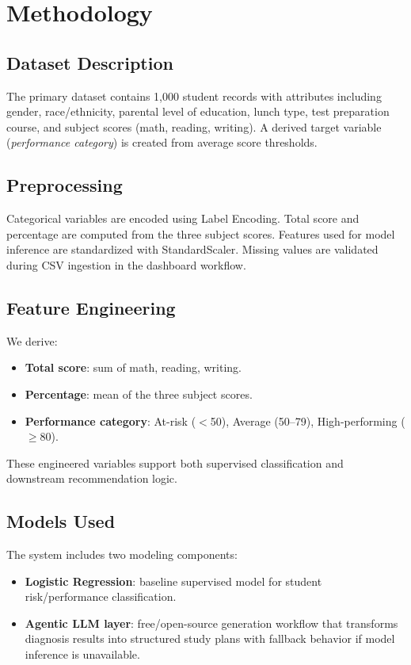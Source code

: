 \documentclass[conference]{IEEEtran}
\begin{document}
\section{Methodology}

\subsection{Dataset Description}
The primary dataset contains 1,000 student records with attributes including gender, race/ethnicity, parental level of education, lunch type, test preparation course, and subject scores (math, reading, writing). A derived target variable (\textit{performance category}) is created from average score thresholds.

\subsection{Preprocessing}
Categorical variables are encoded using Label Encoding. Total score and percentage are computed from the three subject scores. Features used for model inference are standardized with StandardScaler. Missing values are validated during CSV ingestion in the dashboard workflow.

\subsection{Feature Engineering}
We derive:
\begin{itemize}
    \item \textbf{Total score}: sum of math, reading, writing.
    \item \textbf{Percentage}: mean of the three subject scores.
    \item \textbf{Performance category}: At-risk ($<$50), Average (50--79), High-performing ($\geq$80).
\end{itemize}
These engineered variables support both supervised classification and downstream recommendation logic.

\subsection{Models Used}
The system includes two modeling components:
\begin{itemize}
    \item \textbf{Logistic Regression}: baseline supervised model for student risk/performance classification.
    \item \textbf{Agentic LLM layer}: free/open-source generation workflow that transforms diagnosis results into structured study plans with fallback behavior if model inference is unavailable.
\end{itemize}
\end{document}
